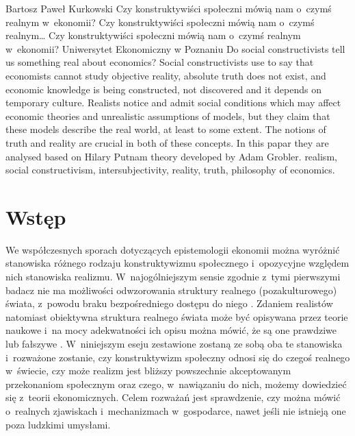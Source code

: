 \begin{artplenv}{Bartosz Paweł Kurkowski}
	{Czy konstruktywiści społeczni mówią nam o~czymś realnym w~ekonomii?}
	{Czy konstruktywiści społeczni mówią nam o~czymś realnym\ldots}
	{Czy konstruktywiści społeczni mówią nam o~czymś realnym\\w~ekonomii?}
	{Uniwersytet Ekonomiczny w Poznaniu}
	{Do social constructivists tell us something real about economics?}
	{Social constructivists use to say that economists cannot study objective reality, absolute truth does not exist, and economic
		knowledge is being constructed, not discovered and it depends on temporary culture. Realists notice and admit social
		conditions which may affect economic theories and unrealistic assumptions of models, but they claim that these models
		describe the real world, at least to some extent. The notions of truth and reality are crucial in both of these concepts. In this papar they are analysed based on Hilary Putnam theory developed by Adam Grobler.}
	{realism, social constructivism, intersubjectivity, reality, truth, philosophy of economics.}



\section*{Wstęp}

\lettrine[loversize=0.13,lines=2,lraise=-0.05,nindent=0em,findent=0.2pt]%
{W}{}e współczesnych sporach dotyczących epistemologii ekonomii można wyróżnić stanowiska różnego rodzaju konstruktywizmu
społecznego i~opozycyjne względem nich stanowiska realizmu. W~najogólniejszym sensie zgodnie z~tymi pierwszymi badacz
nie ma możliwości odwzorowania struktury realnego (pozakulturowego) świata, z~powodu braku bezpośredniego dostępu do
niego
\parencite[s.~30]{zboron_teorie_2009}.
Zdaniem realistów natomiast obiektywna struktura realnego świata
może być opisywana przez teorie naukowe i~na mocy adekwatności ich opisu można mówić, że są one prawdziwe lub fałszywe
\parencite[s.~74]{kincaid_realistic_2009}.
W~niniejszym eseju zestawione zostaną ze sobą oba te stanowiska i~rozważone
zostanie, czy konstruktywizm społeczny odnosi się do czegoś realnego w~świecie, czy może realizm jest bliższy
powszechnie akceptowanym przekonaniom społecznym oraz czego, w~nawiązaniu do nich, możemy dowiedzieć się z~teorii
ekonomicznych. Celem rozważań jest sprawdzenie, czy można mówić o~realnych zjawiskach i~mechanizmach w~gospodarce,
nawet jeśli nie istnieją one poza ludzkimi umysłami.


\end{artplenv}
